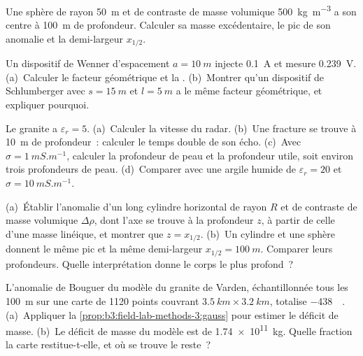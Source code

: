 \begin{exercise}[$\star$]\label{exo:b3:field-lab-methods-3:2}
Une sphère de rayon \qty{50}{m} et de contraste de masse volumique
\qty{+500}{kg.m^{-3}} a son centre à \qty{100}{m} de profondeur. Calculer sa
masse excédentaire, le pic de son anomalie et la demi-largeur $x_{1/2}$.
\end{exercise}

\begin{exercise}[$\star$]\label{exo:b3:field-lab-methods-3:3}
Un dispositif de Wenner d'espacement $a = \qty{10}{m}$ injecte \qty{0.1}{A} et
mesure \qty{0.239}{V}. (a)~Calculer le facteur géométrique et la . (b)~Montrer qu'un dispositif de Schlumberger avec $s =
\qty{15}{m}$ et $l = \qty{5}{m}$ a le même facteur géométrique, et expliquer
pourquoi.
\end{exercise}

\begin{exercise}[$\star$]\label{exo:b3:field-lab-methods-3:4}
Le granite a $\varepsilon_r = 5$. (a)~Calculer la vitesse du radar. (b)~Une
fracture se trouve à \qty{10}{m} de profondeur~: calculer le temps double de son
écho. (c)~Avec $\sigma = \qty{1}{mS.m^{-1}}$, calculer la profondeur de peau et la
profondeur utile, soit environ trois profondeurs de peau. (d)~Comparer avec une
argile humide de $\varepsilon_r = 20$ et $\sigma = \qty{10}{mS.m^{-1}}$.
\end{exercise}

\begin{exercise}[$\star\star$]\label{exo:b3:field-lab-methods-3:5}
(a)~Établir l'anomalie d'un long cylindre horizontal de rayon $R$ et de contraste
de masse volumique $\Delta\rho$, dont l'axe se trouve à la profondeur $z$, à partir
de celle d'une masse linéique, et montrer que $z = x_{1/2}$. (b)~Un cylindre et une
sphère donnent le même pic et la même demi-largeur $x_{1/2} = \qty{100}{m}$.
Comparer leurs profondeurs. Quelle interprétation donne le corps le plus profond~?
\end{exercise}

\begin{exercise}[$\star\star$]\label{exo:b3:field-lab-methods-3:6}
L'anomalie de Bouguer du modèle du granite de Varden, échantillonnée tous les
\qty{100}{m} sur une carte de \num{1120} points couvrant $\qty{3.5}{km}
\times \qty{3.2}{km}$, totalise \qty{-438}{\milli\gal}. (a)~Appliquer
la \cref{prop:b3:field-lab-methods-3:gauss} pour estimer le déficit de masse.
(b)~Le déficit de masse du modèle est de \qty{1.74e11}{kg}. Quelle fraction la
carte restitue-t-elle, et où se trouve le reste~?
\end{exercise}

